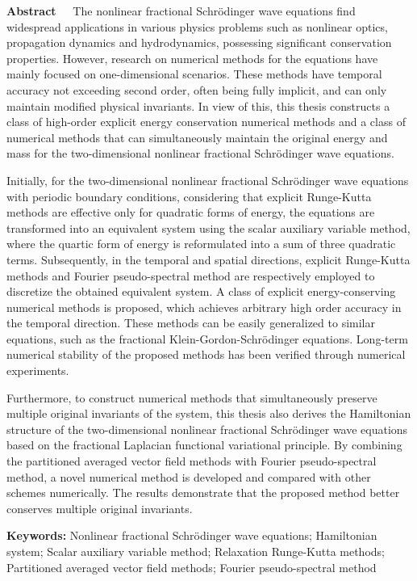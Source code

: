 \begin{EnglishAbstract}
\item {\bf Abstract\ \ } 
The nonlinear fractional Schr{\"o}dinger wave equations find widespread applications in various physics problems such as nonlinear optics, propagation dynamics and hydrodynamics, possessing significant conservation properties. 
However, research on numerical methods for the equations have mainly focused on one-dimensional scenarios. These methods have temporal accuracy not exceeding second order, often being fully implicit, and can only maintain modified physical invariants.
In view of this, this thesis constructs a class of high-order explicit energy conservation numerical methods and a class of numerical methods that can simultaneously maintain the original energy and mass for the two-dimensional nonlinear fractional Schr{\"o}dinger wave equations.

Initially,  for the two-dimensional nonlinear fractional Schr{\"o}dinger wave equations with periodic boundary conditions, considering that explicit Runge-Kutta methods are effective only for quadratic forms of energy, the equations are transformed into an equivalent system using the scalar auxiliary variable method, 
where the quartic form of energy is reformulated into a sum of three quadratic terms. 
Subsequently, in the temporal and spatial directions, explicit Runge-Kutta methods and Fourier pseudo-spectral method are respectively employed to discretize the obtained equivalent system. 
A class of explicit energy-conserving numerical methods is proposed, which achieves arbitrary high order accuracy in the temporal direction. 
These methods can be easily generalized to similar equations, such as the fractional Klein-Gordon-Schr{\"o}dinger equations.
Long-term numerical stability of the proposed methods has been verified through numerical experiments.

Furthermore, to construct numerical methods that simultaneously preserve multiple original invariants of the system, this thesis also derives the Hamiltonian structure of the two-dimensional nonlinear fractional Schr{\"o}dinger wave equations based on the fractional Laplacian functional variational principle. 
By combining the partitioned averaged vector field methods with Fourier pseudo-spectral method, a novel numerical method is developed and compared with other schemes numerically. The results demonstrate that the proposed method better conserves multiple original invariants.

\item {\bf Keywords:} Nonlinear fractional Schr{\"o}dinger wave equations; Hamiltonian system; Scalar auxiliary variable method; Relaxation Runge-Kutta methods; Partitioned averaged vector field methods; Fourier pseudo-spectral method
\end{EnglishAbstract}